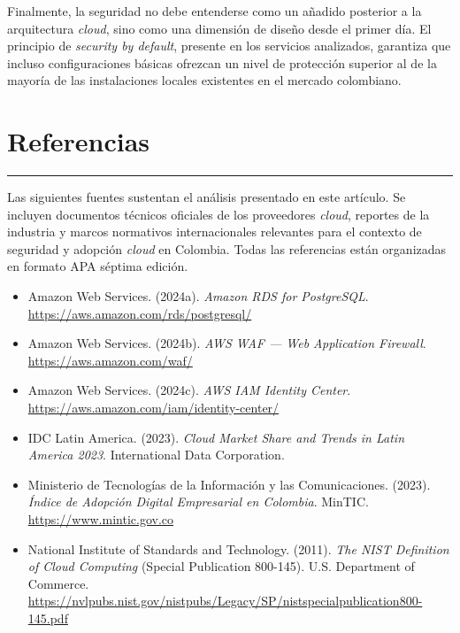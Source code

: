 \documentclass[12pt, a4paper]{article}
\begin{document}
Finalmente, la seguridad no debe entenderse como un añadido posterior a la arquitectura \textit{cloud}, sino como una dimensión de diseño desde el primer día. El principio de \textit{security by default}, presente en los servicios analizados, garantiza que incluso configuraciones básicas ofrezcan un nivel de protección superior al de la mayoría de las instalaciones locales existentes en el mercado colombiano.


\section*{Referencias}
\hrule
\vspace{8pt}

Las siguientes fuentes sustentan el análisis presentado en este artículo. Se incluyen documentos técnicos oficiales de los proveedores \textit{cloud}, reportes de la industria y marcos normativos internacionales relevantes para el contexto de seguridad y adopción \textit{cloud} en Colombia. Todas las referencias están organizadas en formato APA séptima edición.

\vspace{8pt}

\begin{itemize}
  \item Amazon Web Services. (2024a). \textit{Amazon RDS for PostgreSQL}. \url{https://aws.amazon.com/rds/postgresql/}

  \item Amazon Web Services. (2024b). \textit{AWS WAF — Web Application Firewall}. \url{https://aws.amazon.com/waf/}

  \item Amazon Web Services. (2024c). \textit{AWS IAM Identity Center}. \url{https://aws.amazon.com/iam/identity-center/}

  \item IDC Latin America. (2023). \textit{Cloud Market Share and Trends in Latin America 2023}. International Data Corporation.

  \item Ministerio de Tecnologías de la Información y las Comunicaciones. (2023). \textit{Índice de Adopción Digital Empresarial en Colombia}. MinTIC. \url{https://www.mintic.gov.co}

  \item National Institute of Standards and Technology. (2011). \textit{The NIST Definition of Cloud Computing} (Special Publication 800-145). U.S. Department of Commerce. \url{https://nvlpubs.nist.gov/nistpubs/Legacy/SP/nistspecialpublication800-145.pdf}
\end{itemize}
\end{document}
